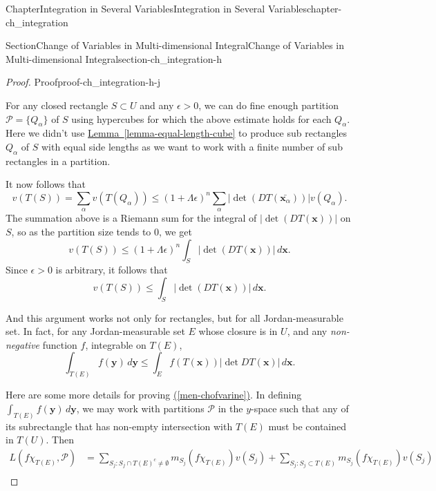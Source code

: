 \documentclass[oneside,10pt,]{book}
\newcommand{\xreffont}{\relax}
\numberwithin{equation}{section}
\newcommand{\cP}{\mathcal{P}}
\newcommand{\amp}{&}
\begin{document}
\begin{chapterptx}{Chapter}{Integration in Several Variables}{}{Integration in Several Variables}{}{}{chapter-ch_integration}
\begin{sectionptx}{Section}{Change of Variables in Multi-dimensional Integral}{}{Change of Variables in Multi-dimensional Integral}{}{}{section-ch_integration-h}
\begin{proof}{Proof}{}{proof-ch_integration-h-j}
\par
For any closed rectangle \(S\subset U\) and any \(\epsilon>0\), we can do fine enough partition \(\cP=\{Q_{\alpha}\}\) of \(S\) using hypercubes for which the above estimate holds for each \(Q_{\alpha}\). Here we didn't use \hyperref[lemma-equal-length-cube]{Lemma~{\xreffont\ref{lemma-equal-length-cube}}} to produce sub rectangles \(Q_{\alpha}\) of \(S\) with equal side lengths as we want to work with a finite number of sub rectangles in a partition.%
\par
It now follows that%
\begin{equation*}
v(T(S))=\sum_{\alpha}v(T(Q_{\alpha})) \le  (1+\Lambda \epsilon)^n \sum_{\alpha}
\left|\det \left(DT(\bar {\mathbf x_{\alpha}})\right)\right|  v (Q_{\alpha})\text{.}
\end{equation*}
The summation above is a Riemann sum for the integral of \(\left|\det \left(DT({\mathbf x})\right)\right|\) on \(S\), so as the partition size tends to \(0\), we get%
\begin{equation*}
v(T(S)) \le (1 +\Lambda \epsilon)^{n}\int_{S} \left|\det \left(D T( {\mathbf x})\right)\right|\, d{\mathbf x}.
\end{equation*}
Since \(\epsilon>0\) is arbitrary, it follows that%
\begin{equation*}
v(T(S))\le \int_{S} \left|\det \left(DT( {\mathbf x})\right)\right|\, d{\mathbf x}.
\end{equation*}
%
\par
And this argument works not only for rectangles, but for all Jordan-measurable set. In fact, for any Jordan-measurable set \(E\) whose closure is in \(U\), and any \emph{non-negative} function \(f\), integrable on \(T(E)\),%
\begin{equation}
\int_{T(E)}f({\mathbf y})\, d{\mathbf y} \le \int_{E} f(T({\mathbf x}))|\det DT({\mathbf x})|\, d{\mathbf x}.\label{men-chofvarine}
\end{equation}
%
\par
Here are some more details for proving \hyperref[men-chofvarine]{({\xreffont\ref{men-chofvarine}})}. In defining \(\int_{T(E)}f({\mathbf y})\, d{\mathbf y}\),  we may work with partitions \(\cP\) in the \(y\)-space such that any of its subrectangle that has non-empty intersection with \(T(E)\) must be contained in \(T(U)\). Then%
\begin{align*}
L(f \chi_{T(E)}, \cP) \amp  = \sum_{S_{j}: S_{j}\cap T(E)^{c}\ne \emptyset} m_{S_{j}}(f \chi_{T(E)})v(S_{j})
+ \sum_{S_{j}: S_{j}\subset T(E)} m_{S_{j}}(f \chi_{T(E)})v(S_{j})\\

\end{align*}
\end{proof}
\end{sectionptx}
\end{chapterptx}
\end{document}
